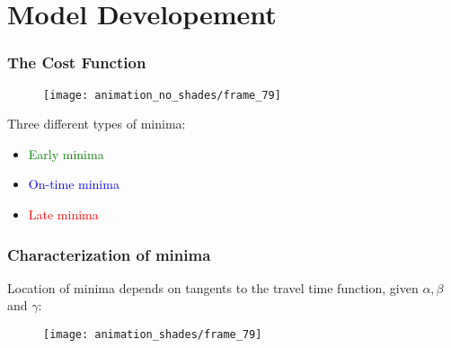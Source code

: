 \documentclass[hyperref={pdfpagelabels=false}]{beamer}
\begin{document}
\section{Model Developement}

\begin{frame}
  \tableofcontents[currentsection]
\end{frame}

\begin{frame}
  \frametitle{The Cost Function}
  \begin{figure}
    \centering
    \texttt{[image: animation\_no\_shades/frame\_79]}
  \end{figure}
  Three different types of minima:
  \begin{itemize}
  \item \textcolor{green}{Early minima}
  \item \textcolor{blue}{On-time minima}
  \item \textcolor{red}{Late minima}
  \end{itemize}
\end{frame}

\begin{frame}
  \frametitle{Characterization of minima}
  Location of minima depends on tangents to the travel time function, given \(\alpha, \beta\) and \(\gamma\):
  \begin{figure}
    \centering
    \texttt{[image: animation\_shades/frame\_79]}
  \end{figure}
\end{frame}
\end{document}

